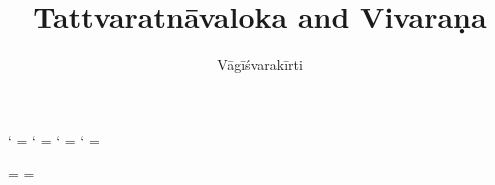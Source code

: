 \documentclass[12pt]{article}
\title{Tattvaratnāvaloka and Vivaraṇa}
\author{Vāgīśvarakīrti}
\begin{document}
\maketitle

\makeatletter
\newXeTeXintercharclass\noextraclass
\XeTeXcharclass `\? = \noextraclass
\XeTeXcharclass `\! = \noextraclass
\XeTeXcharclass `\; = \noextraclass
\XeTeXcharclass `\: = \noextraclass

\AddOpEmph{|}
\AddOpEmph{/}

 \noextraclass = {\nobreak}
\XeTeXinterchartoks {} = {\nobreak}
\makeatother

\newcommand{\PCreading}{$^{pc}$}
\newcommand{\ACreading}{$^{ac}$}
\newcommand{\MS}{K}
\newcommand{\EDD}{E\textsubscript{DH}}
\newcommand{\TM}{TM\textsubscript{D}}
\newcommand{\TVA}{TVA\textsubscript{D}}
\newcommand{\TVB}{TVB\textsubscript{N}}
\newcommand{\TIB}{TIB}
\newcommand{\sigmareading}[1]{$\Sigma$\textsubscript{#1}}

\newcommand{\emd} {\emph{em.}}
\newcommand{\conj} {\emph{conj.}}
\newcommand{\possibleconj} {\emph{possible conj.}}
\newcommand{\corr} {\emph{corr.}}
\newcommand{\diag} {\emph{diag.\ conj.}}
\newcommand{\possibleemd} {\emph{possible em.}}
\end{document}
